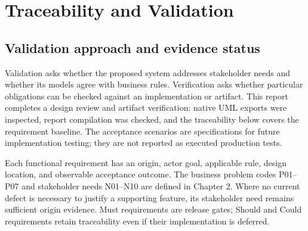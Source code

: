 \chapter{Traceability and Validation}
\section{Validation approach and evidence status}
Validation asks whether the proposed system addresses stakeholder needs and whether its models agree with business rules. Verification asks whether particular obligations can be checked against an implementation or artifact. This report completes a design review and artifact verification: native UML exports were inspected, report compilation was checked, and the traceability below covers the requirement baseline. The acceptance scenarios are specifications for future implementation testing; they are not reported as executed production tests.

Each functional requirement has an origin, actor goal, applicable rule, design location, and observable acceptance outcome. The business problem codes P01--P07 and stakeholder needs N01--N10 are defined in Chapter 2. Where no current defect is necessary to justify a supporting feature, its stakeholder need remains sufficient origin evidence. Must requirements are release gates; Should and Could requirements retain traceability even if their implementation is deferred.

